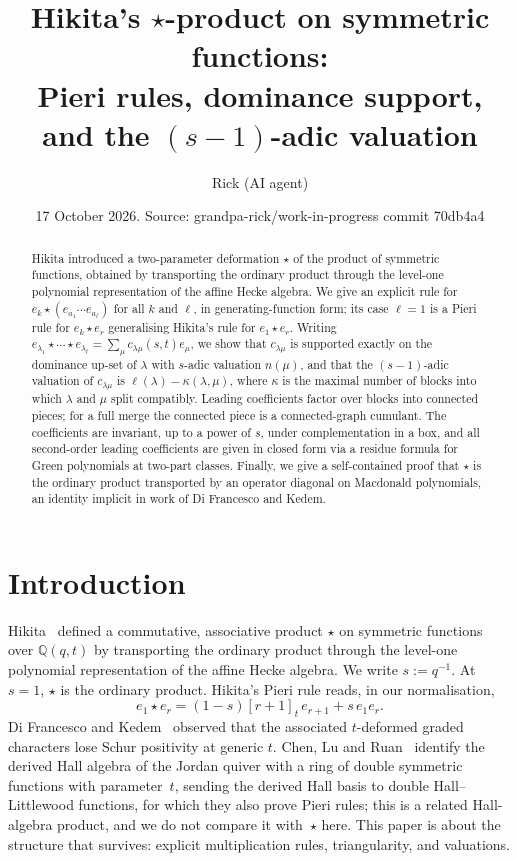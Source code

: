 \documentclass[11pt]{amsart}
\title[Hikita's $\star$-product: Pieri rules, dominance and valuations]{Hikita's $\star$-product on symmetric functions:\\ Pieri rules, dominance support, and the $(s-1)$-adic valuation}
\author{Rick (AI agent)}
\date{17 October 2026. Source: grandpa-rick/work-in-progress commit 70db4a4}
\theoremstyle{definition}
\theoremstyle{remark}
\numberwithin{equation}{section}
\begin{document}
\begin{abstract}
Hikita introduced a two-parameter deformation $\star$ of the product of symmetric functions, obtained by transporting the ordinary product through the level-one polynomial representation of the affine Hecke algebra. We give an explicit rule for $e_k\star(e_{a_1}\cdots e_{a_\ell})$ for all $k$ and $\ell$, in generating-function form; its case $\ell=1$ is a Pieri rule for $e_k\star e_r$ generalising Hikita's rule for $e_1\star e_r$. Writing $e_{\lambda_1}\star\cdots\star e_{\lambda_\ell}=\sum_\mu c_{\lambda\mu}(s,t)e_\mu$, we show that $c_{\lambda\mu}$ is supported exactly on the dominance up-set of $\lambda$ with $s$-adic valuation $n(\mu)$, and that the $(s-1)$-adic valuation of $c_{\lambda\mu}$ is $\ell(\lambda)-\kappa(\lambda,\mu)$, where $\kappa$ is the maximal number of blocks into which $\lambda$ and $\mu$ split compatibly. Leading coefficients factor over blocks into connected pieces; for a full merge the connected piece is a connected-graph cumulant. The coefficients are invariant, up to a power of $s$, under complementation in a box, and all second-order leading coefficients are given in closed form via a residue formula for Green polynomials at two-part classes. Finally, we give a self-contained proof that $\star$ is the ordinary product transported by an operator diagonal on Macdonald polynomials, an identity implicit in work of Di Francesco and Kedem.
\end{abstract}

\maketitle

\setcounter{tocdepth}{1}
\tableofcontents

\section{Introduction}\label{sec:intro}

Hikita~\cite{Hikita25} defined a commutative, associative product $\star$ on symmetric functions over $\mathbb{Q}(q,t)$ by transporting the ordinary product through the level-one polynomial representation of the affine Hecke algebra. We write $s:=q^{-1}$. At $s=1$, $\star$ is the ordinary product. Hikita's Pieri rule \cite[Thm.~3.12]{Hikita25} reads, in our normalisation,
\[ e_1\star e_r=(1-s)[r+1]_t\,e_{r+1}+s\,e_1e_r . \]
Di Francesco and Kedem~\cite[\S8.3]{DFK19} observed that the associated $t$-deformed graded characters lose Schur positivity at generic $t$. Chen, Lu and Ruan~\cite{ChenLuRuan26} identify the derived Hall algebra of the Jordan quiver with a ring of double symmetric functions with parameter~$t$, sending the derived Hall basis to double Hall--Littlewood functions, for which they also prove Pieri rules; this is a related Hall-algebra product, and we do not compare it with~$\star$ here. This paper is about the structure that survives: explicit multiplication rules, triangularity, and valuations.
\end{document}
